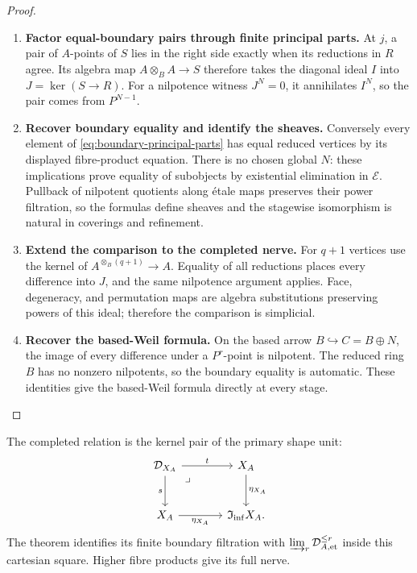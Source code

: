 \documentclass[11pt,a4paper]{article}
\numberwithin{algorithm}{section}
\numberwithin{equation}{section}
\theoremstyle{definition}
\theoremstyle{remark}
\theoremstyle{plain}
\newcommand{\E}{\mathcal E}
\newcommand{\InfShape}{\mathfrak I_{\mathrm{inf}}}
\theoremstyle{definition}
\theoremstyle{plain}
\begin{document}
\begin{proof}\leavevmode
\begin{enumerate}[leftmargin=*,align=left]
\item \textbf{Factor equal-boundary pairs through finite principal parts.}
At $j$, a pair of $A$-points of $S$ lies in the right side
exactly when its reductions in $R$ agree.  Its algebra map
$A\otimes_BA\to S$ therefore takes the diagonal ideal
$I$ into $J=\ker(S\to R)$.  For a nilpotence witness
$J^N=0$, it annihilates $I^N$, so the pair comes from
$P^{N-1}$.

\item \textbf{Recover boundary equality and identify the sheaves.}
Conversely every element of
\eqref{eq:boundary-principal-parts} has equal reduced
vertices by its displayed fibre-product equation.  There is
no chosen global $N$: these implications prove equality of
subobjects by existential elimination in $\E$.  Pullback of
nilpotent quotients along \'etale maps preserves their power
filtration, so the formulas define sheaves and the stagewise
isomorphism is natural in coverings and refinement.

\item \textbf{Extend the comparison to the completed nerve.}
For $q+1$ vertices use the kernel of
$A^{\otimes_B(q+1)}\to A$.  Equality of all reductions
places every difference into $J$, and the same nilpotence
argument applies.  Face, degeneracy, and permutation maps
are algebra substitutions preserving powers of this ideal;
therefore the comparison is simplicial.

\item \textbf{Recover the based-Weil formula.}
On the based arrow $B\hookrightarrow C=B\oplus N$,
the image of every difference under a $P^r$-point is
nilpotent.  The reduced ring $B$ has no nonzero nilpotents,
so the boundary equality is automatic. These identities give the
based-Weil formula directly at every stage.
\end{enumerate}
\end{proof}


The completed relation is the kernel pair of the primary shape unit:
\[
\begin{tikzcd}[column sep=large,row sep=large]
 \mathcal D_{X_A} \arrow[dr,phantom,"\lrcorner",very near start] \arrow[r,"{t}"] \arrow[d,"{s}"']
   & X_A \arrow[d,"{\eta_{X_A}}"]\\
 X_A \arrow[r,"{\eta_{X_A}}"'] & \InfShape X_A .
\end{tikzcd}
\]
The theorem identifies its finite boundary filtration with
$\varinjlim_r\mathcal D_{A,\mathrm{et}}^{\le r}$ inside this
cartesian square.  Higher fibre products give its full nerve.
\end{document}
